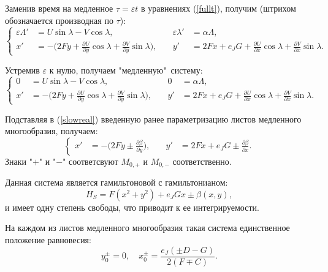Заменив время на медленное $\tau = \varepsilon t$ в уравнениях (\ref{fullt}), получим (штрихом обозначается производная по $\tau$):
\begin{equation}
    \left\{
    \begin{aligned}
        \varepsilon \Lambda' &= U \sin \lambda - V \cos \lambda,
        &\quad
        \varepsilon \lambda' &= \alpha \Lambda,\\
        x' &= - \big( 2Fy+\frac{\partial U}{\partial y} \cos \lambda + \frac{\partial V}{\partial y} \sin \lambda \big),
        &\quad
        y' &= 2Fx+e_JG +\frac{\partial U}{\partial x} \cos \lambda + \frac{\partial V}{\partial x} \sin \lambda.
    \end{aligned}
    \right.
    \label{fulltau}
\end{equation}

Устремив $\varepsilon$ к нулю, получаем "медленную"\, систему:
\begin{equation}
    \left\{
    \begin{aligned}
        0 &= U \sin \lambda - V \cos \lambda,
        &\quad
        0 &= \alpha \Lambda, \\
        x' &= -\big( 2Fy+\frac{\partial U}{\partial y} \cos \lambda + \frac{\partial V}{\partial y} \sin \lambda \big),
        &\quad
        y' &= 2Fx+e_JG +\frac{\partial U}{\partial x} \cos \lambda + \frac{\partial V}{\partial x} \sin \lambda.
    \end{aligned}
    \right.
    \label{slowreal}
\end{equation}

Подставляя в (\ref{slowreal}) введенную ранее параметризацию листов медленного многообразия, получаем:
\begin{equation}
    \left\{
    \begin{aligned}
        x' &= - \big( 2Fy \pm \frac{\partial \beta}{\partial y} \big),
        &\quad
        y' &= 2Fx+e_JG \pm \frac{\partial \beta}{\partial x}.
    \end{aligned}
    \right.
    \label{slow_sys}
\end{equation}
Знаки "$+$" и "$-$" соответсвуют $M_{0,+}$ и $M_{0,-}$ соответственно.

Данная система является гамильтоновой с гамильтонианом:
$$H_S = F(x^2+y^2) + e_JGx \pm \beta(x,y),$$
и имеет одну степень свободы, что приводит к ее интегрируемости.

На каждом из листов медленного многообразия такая система единственное положение равновесия:
$$
y_0^{\pm} = 0,\quad
x_0^{\pm} = \frac{e_J (\pm D - G)}{2(F \mp C)}.
$$

